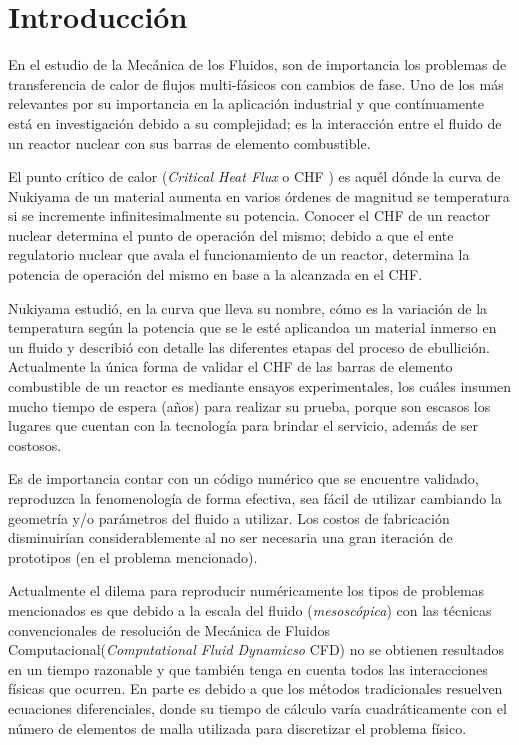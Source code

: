 \chapter{Introducción}
\graphicspath{{figs/cap1/}}
\label{cap1}



En el estudio de la Mecánica de los Fluidos, son de importancia los problemas de transferencia de calor de flujos multi-fásicos con cambios de fase. Uno de los más relevantes por su importancia en la aplicación industrial y que contínuamente está en investigación debido a su complejidad; es la interacción entre el fluido de un reactor nuclear con sus barras de elemento combustible.

El punto crítico de calor (\textit{Critical Heat Flux} o CHF ) es aquél dónde la curva de Nukiyama de un material aumenta en varios órdenes de magnitud se temperatura si se incremente infinitesimalmente su potencia. Conocer el CHF de un reactor nuclear determina el punto de operación del mismo; debido a que el ente regulatorio nuclear que avala el funcionamiento de un reactor, determina la potencia de operación del mismo en base a la alcanzada en el CHF.

Nukiyama estudió, en la curva que lleva su nombre, cómo es la variación de la temperatura según la potencia que se le esté aplicandoa un material inmerso en un fluido y describió con detalle las diferentes etapas del proceso de ebullición. Actualmente la única forma de validar el CHF de las barras de elemento combustible de un reactor es mediante ensayos experimentales, los cuáles insumen mucho tiempo de espera (años) para realizar su prueba, porque son escasos los lugares que cuentan con la tecnología para brindar el servicio, además de ser costosos. 

Es de importancia contar con un código numérico que se encuentre validado, reproduzca la fenomenología de forma efectiva, sea fácil de utilizar cambiando la geometría y/o parámetros del fluido a utilizar. Los costos de fabricación disminuirían considerablemente al no ser necesaria una gran iteración de prototipos (en el problema mencionado).

Actualmente el dilema para reproducir numéricamente los tipos de problemas mencionados es que debido a la escala del fluido (\textit{mesoscópica}) con las técnicas convencionales de resolución de Mecánica de Fluidos Computacional(\textit{Computational Fluid Dynamicso} CFD) no se obtienen resultados en un tiempo razonable y que también tenga en cuenta todos las interacciones físicas que ocurren. En parte es debido a que los métodos tradicionales resuelven ecuaciones diferenciales, donde su tiempo de cálculo varía cuadráticamente con el número de elementos de malla utilizada para discretizar el problema físico.

